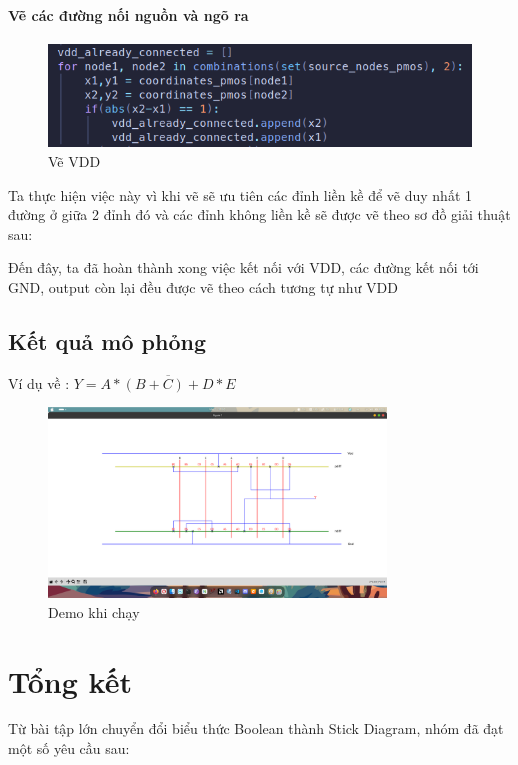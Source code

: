 \documentclass[a4paper,12pt]{article}
\begin{document}
\paragraph{Vẽ các đường nối nguồn và ngõ ra}


\begin{figure}
    \centering
    \includegraphics[width=1\textwidth]{../PNG/VDD.png}
    \caption{Vẽ VDD}
    \label{fig:VDD}
\end{figure}

Ta thực hiện việc này vì khi vẽ sẽ ưu tiên các đỉnh liền kề để vẽ duy nhất 1 đường ở giữa 2 đỉnh đó và 
các đỉnh không liền kề sẽ được vẽ theo sơ đồ giải thuật sau:


Đến đây, ta đã hoàn thành xong việc kết nối với VDD, các đường kết nối tới GND, output còn lại đều được vẽ theo cách tương tự như VDD
\subsection{Kết quả mô phỏng}
Ví dụ về : \( Y = \overline{A *(B + C) + D * E} \)

\begin{figure}
    \centering
    \includegraphics[width=0.8\textwidth]{../PNG/DEMO.png}
    \caption{Demo khi chạy}
    \label{fig:DEMO}
\end{figure}
\newpage
\section{Tổng kết}
Từ bài tập lớn chuyển đổi biểu thức Boolean thành Stick Diagram, nhóm đã đạt một số yêu cầu sau:
\end{document}
